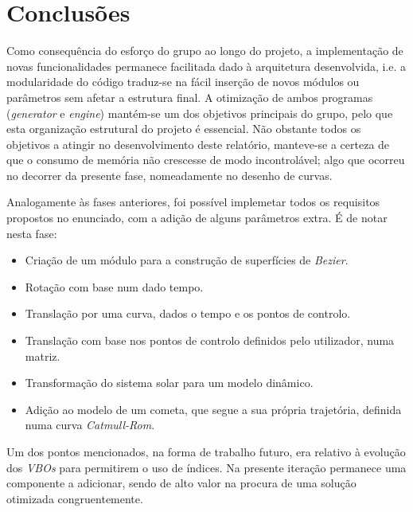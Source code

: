 \documentclass[relatorio.tex]{subfiles}
\begin{document}
\section{Conclusões}
Como consequência do esforço do grupo ao longo do projeto, a implementação de novas funcionalidades
permanece facilitada dado à arquitetura desenvolvida, i.e. a modularidade do código 
traduz-se na fácil inserção de novos módulos ou parâmetros sem afetar a estrutura final.
A otimização de ambos programas (\textit{generator} e \textit{engine}) mantém-se um
dos objetivos principais do grupo, pelo que esta organização estrutural do projeto é essencial.
Não obstante todos os objetivos a atingir no desenvolvimento deste relatório, manteve-se 
a certeza de que o consumo de memória não crescesse de modo incontrolável; algo que 
ocorreu no decorrer da presente fase, nomeadamente no desenho de curvas.

Analogamente às fases anteriores, foi possível implemetar todos os requisitos propostos 
no enunciado, com a adição de alguns parâmetros extra.
É de notar nesta fase:
\begin{itemize}
    \item Criação de um módulo para a construção de superfícies de \textit{Bezier}.
    \item Rotação com base num dado tempo.
    \item Translação por uma curva, dados o tempo e os pontos de controlo.
    \item Translação com base nos pontos de controlo definidos pelo utilizador, numa matriz.
    \item Transformação do sistema solar para um modelo dinâmico.
    \item Adição ao modelo de um cometa, que segue a sua própria trajetória, definida numa curva \textit{Catmull-Rom}.
\end{itemize}

Um dos pontos mencionados, na forma de trabalho futuro, era relativo à evolução dos \textit{VBOs}
para permitirem o uso de índices. Na presente iteração permanece uma componente a adicionar, sendo
de alto valor na procura de uma solução otimizada congruentemente.
\end{document}
